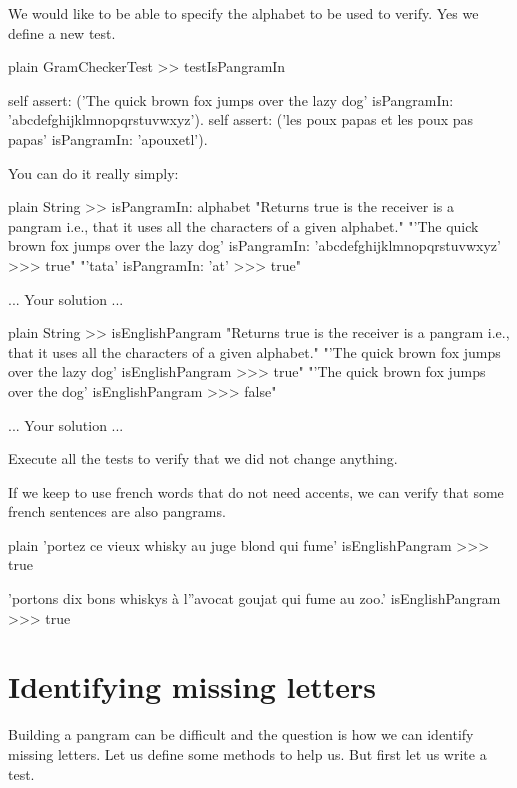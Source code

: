 \documentclass[10pt,twoside,english]{_support/latex/sbabook/sbabook}
\begin{document}
We would like to be able to specify the alphabet to be used to verify. Yes we define a new test.

\begin{displaycode}{plain}
GramCheckerTest >> testIsPangramIn

	self assert: ('The quick brown fox jumps over the lazy dog' isPangramIn: 'abcdefghijklmnopqrstuvwxyz').
	self assert: ('les poux papas et les poux pas papas' isPangramIn: 'apouxetl').
\end{displaycode}

You can do it really simply: 

\begin{displaycode}{plain}
String >> isPangramIn: alphabet
	"Returns true is the receiver is a pangram i.e., that it uses all the characters of a given alphabet."
	"'The quick brown fox jumps over the lazy dog' isPangramIn: 'abcdefghijklmnopqrstuvwxyz'
	>>> true"
	"'tata' isPangramIn: 'at'
	>>> true"

	... Your solution ...
\end{displaycode}

\begin{displaycode}{plain}
String >> isEnglishPangram
	"Returns true is the receiver is a pangram i.e., that it uses all the characters of a given alphabet."
	"'The quick brown fox jumps over the lazy dog' isEnglishPangram
	>>> true"
	"'The quick brown fox jumps over the dog' isEnglishPangram
	>>> false"

	... Your solution ...
\end{displaycode}

Execute all the tests to verify that we did not change anything.

If we keep to use french words that do not need accents, we can verify that some french sentences are also pangrams. 

\begin{displaycode}{plain}
'portez ce vieux whisky au juge blond qui fume' isEnglishPangram
>>> true

'portons dix bons whiskys à l''avocat goujat qui fume au zoo.' isEnglishPangram
>>> true
\end{displaycode}
\section{Identifying missing letters}
Building a pangram can be difficult and the question is how we can identify missing letters. Let us define some methods to help us. But first let us write a test. 
\end{document}
